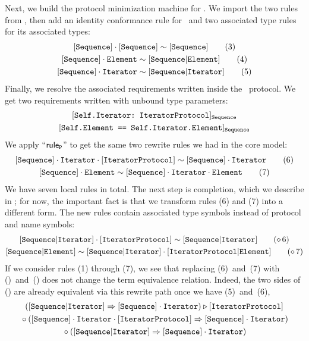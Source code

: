 \documentclass[../generics]{subfiles}
\begin{document}
\begin{example}
Next, we build the protocol minimization machine for \tSequence. We import the two rules from \tIterator, then add an identity conformance rule for \tSequence\ and two associated type rules for its associated types:
\begin{gather*}
\ConfRule{\pSequence}{\pSequence}\tag{3}\\
\AssocRule{Sequence}{Element}\tag{4}\\
\AssocRule{Sequence}{Iterator}\tag{5}
\end{gather*}
Finally, we resolve the associated requirements written inside the \tSequence\ protocol. We get two requirements written with unbound type parameters:
\begin{gather*}
\AssocConfReq{Self.Iterator}{IteratorProtocol}{Sequence}\\
\SameReq{Self.Element}{Self.Iterator.Element}_\tSequence
\end{gather*}
We apply ``$\mathsf{rule}_{\texttt{P}}$'' to get the same two rewrite rules we had in the core model:
\begin{gather*}
\ConfRule{\pSequence\cdot\nIterator}{\pIterator} \tag{6} \\
\SameRule{\pSequence\cdot\nElement}{\pSequence\cdot\nIterator\cdot\nElement} \tag{7}
\end{gather*}
We have seven local rules in total. The next step is completion, which we describe in ; for now, the important fact is that we transform rules (6) and (7) into a different form. The new rules contain associated type symbols instead of protocol and name symbols:
\begin{gather*}
\ConfRule{\assocsym{Sequence}{Iterator}}{\pIterator} \tag{\CRule{6}} \\
\SameRule{\assocsym{Sequence}{Element}}{\assocsym{Sequence}{Iterator}\cdot\assocsym{IteratorProtocol}{Element}} \tag{\CRule{7}}
\end{gather*}
If we consider rules (1) through (7), we see that replacing (6)~and~(7) with ()~and~() does not change the term equivalence relation. Indeed, the two sides of () are already equivalent via this rewrite path once we have (5)~and~(6),
\begin{gather*}
(\assocsym{Sequence}{Iterator} \Rightarrow \pSequence\cdot\nIterator) \WR \pIterator\\
{} \circ (\pSequence\cdot\nIterator\cdot\pIterator \Rightarrow \pSequence\cdot\nIterator)\\
{} \circ (\assocsym{Sequence}{Iterator} \Rightarrow \pSequence\cdot\nIterator)

\end{gather*}
\end{example}
\end{document}
